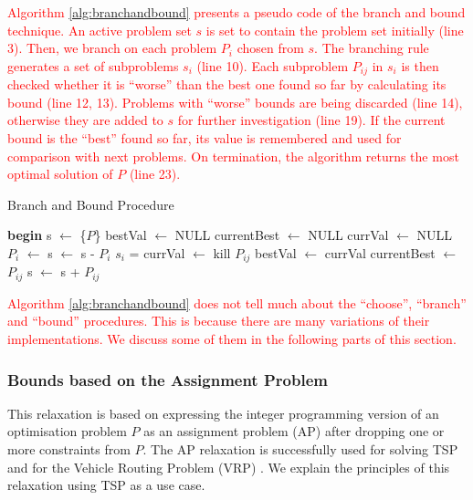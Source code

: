 \documentclass{mprop}
\theoremstyle{definition}
\begin{document}
\textcolor{red}{
Algorithm \ref{alg:branchandbound} presents a pseudo code of the branch and bound technique. An active problem set $s$ is set to contain the problem set initially (line 3). Then, we branch on each problem $P_{i}$ chosen from $s$. The branching rule generates a set of subproblems $s_{i}$ (line 10). Each subproblem $P_{ij}$ in $s_{i}$ is then checked whether it is ``worse'' than the best one found so far by calculating its bound (line 12, 13). Problems with ``worse'' bounds are being discarded (line 14), otherwise they are added to $s$ for further investigation (line 19). If the current bound is the ``best'' found so far, its value is remembered and used for comparison with next problems. On termination, the algorithm returns the most optimal solution of $P$ (line 23).}

\begin{algorithm}
\color{red}
\centering
\caption{Branch and Bound Procedure}
\label{alg:branchandbound}
\begin{algorithmic}[1]
\State \textbf{begin}
\State s $\gets$ \{$P$\} 
\State bestVal $\gets$ NULL
\State currentBest $\gets$ NULL
\State currVal $\gets$ NULL
\State $P_{i}$ $\gets$  
\State s $\gets$ s - $P_{i}$
\State $s_{i}$ =  
\State currVal $\gets$  
\State kill $P_{ij}$ 
\State bestVal $\gets$ currVal
\State currentBest $\gets$ $P_{ij}$
\Else
\State s $\gets$ s + $P_{ij}$
\EndIf
\EndFor
\EndWhile
\State {}
\EndProcedure
\end{algorithmic}
\end{algorithm}

\textcolor{red}{
Algorithm \ref{alg:branchandbound} does not tell much about the ``choose'', ``branch'' and ``bound'' procedures. This is because there are many variations of their implementations. We discuss some of them in the following parts of this section.}

\subsubsection{Bounds based on the Assignment Problem}
This relaxation is based on expressing the integer programming version of an optimisation problem $P$ as an assignment problem (AP) after dropping one or more constraints from $P$.
The AP relaxation is successfully used for solving TSP \cite{Little63,Eastman58,Bellmore71,tspbible,Baker83} and for the Vehicle Routing Problem (VRP) \citep{Laporte86,vrpbible}. We explain the principles of this relaxation using TSP as a use case.
\end{document}
